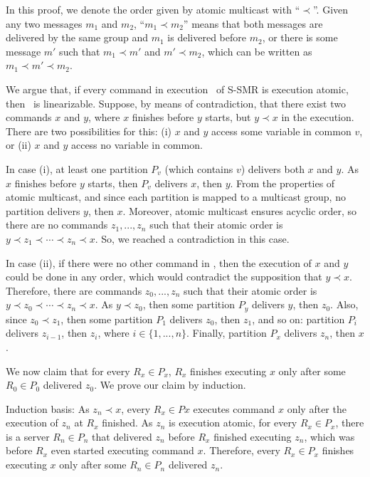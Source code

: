 In this proof, we denote the order given by atomic multicast with ``$\prec$''. Given any two messages $m_1$ and $m_2$, ``$m_1 \prec m_2$'' means that both messages are delivered by the same group and $m_1$ is delivered before $m_2$, or there is some message $m'$ such that $m_1 \prec m'$ and $m' \prec m_2$, which can be written as \mbox{$m_1 \prec m' \prec m_2$}.

We argue that, if every command in execution \ex\ of \mbox{S-SMR} is execution atomic, then \ex\ is linearizable. Suppose, by means of contradiction, that there exist two commands $x$ and $y$, where $x$ finishes before $y$ starts, but $y \prec x$ in the execution. There are two possibilities for this: (i) $x$ and $y$ access some variable in common $v$, or (ii) $x$ and $y$ access no variable in common.

In case (i), at least one partition $P_v$ (which contains $v$) delivers both $x$ and $y$. As $x$ finishes before $y$ starts, then $P_v$ delivers $x$, then $y$. From the properties of atomic multicast, and since each partition is mapped to a multicast group, no partition delivers $y$, then $x$. Moreover, atomic multicast ensures acyclic order, so there are no commands $z_1, ..., z_n$ such that their atomic order is $y \prec z_1 \prec \cdots \prec z_n \prec x$. So, we reached a contradiction in this case.

In case (ii), if there were no other command in \ex, then the execution of $x$ and $y$ could be done in any order, which would contradict the supposition that $y \prec x$. Therefore, there are commands $z_0, ..., z_n$ such that their atomic order is $y \prec z_0 \prec \cdots \prec z_n \prec x$. As $y \prec z_0$, then some partition $P_y$ delivers $y$, then $z_0$. Also, since $z_0 \prec z_1$, then some partition $P_1$ delivers $z_0$, then $z_1$, and so on: partition $P_i$ delivers $z_{i-1}$, then $z_i$, where $i \in \{1, ..., n\}$. Finally, partition $P_x$ delivers $z_n$, then $x$.

We now claim that for every $R_x \in P_x$, $R_x$ finishes executing $x$ only after some $R_0 \in P_0$ delivered $z_0$.
We prove our claim by induction.

Induction basis: As $z_n \prec x$, every $R_x \in Px$ executes command $x$ only after the execution of $z_n$ at $R_x$ finished. As $z_n$ is execution atomic, for every $R_x \in P_x$, there is a server $R_n \in P_n$ that delivered $z_n$ before $R_x$ finished executing $z_n$, which was before $R_x$ even started executing command $x$. Therefore, every $R_x \in P_x$ finishes executing $x$ only after some $R_n \in P_n$ delivered $z_n$.

